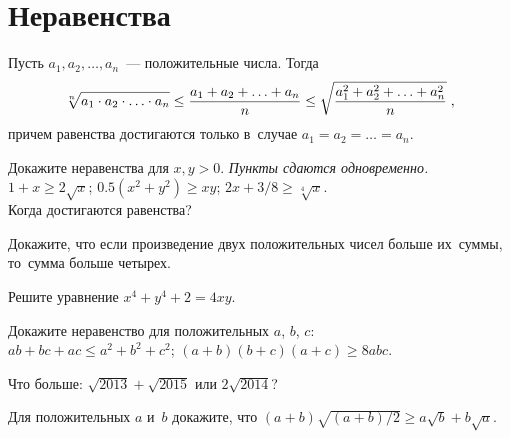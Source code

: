 
\section*{Неравенства}




Пусть $a_1, a_2, \ldots, a_n$~--- положительные числа.
Тогда
\[
    \sqrt[n]{\mathstrut
        a_1 \cdot a_2 \cdot \ldots \cdot a_n
    }
\leq
    \frac{
        a_1 + a_2 + \ldots + a_n
    }{n}
\leq
    \sqrt{\frac{
        a_1^2 + a_2^2 + \ldots + a_n^2
    }{n}}
\;,\]
причем равенства достигаются только в~случае $a_1 = a_2 = \ldots = a_n$.

\begin{problems}

\item
Докажите неравенства для $x, y > 0$.
\emph{Пункты сдаются одновременно.}
\\[0.25ex]
\sp $1 + x \geq 2 \sqrt{x}$;
\quad
\sp $0.5 (x^2 + y^2) \geq x y$;
\quad
\sp $2 x + 3 / 8 \geq \sqrt[4]{x}$.
\\[0.25ex]
Когда достигаются равенства?

\item
Докажите, что если произведение двух положительных чисел больше их~суммы,
то~сумма больше четырех.

\item
Решите уравнение\enspace
$x^4 + y^4 + 2 = 4 x y$.

\item
Докажите неравенство для положительных $a$, $b$, $c$:
\\[0.3ex]
\sp $a b + b c + a c \leq a^2 + b^2 + c^2$;
\qquad
\sp $(a + b) (b + c) (a + c) \geq 8 a b c$.

\item
Что больше:\enspace
$\sqrt{2013} + \sqrt{2015}$\enspace
или\enspace
$2 \sqrt{2014}$?

\item
Для положительных $a$ и~$b$ докажите, что\enspace
\(
    (a + b) \sqrt{(a + b) / 2}
\geq
    a \sqrt{b} + b \sqrt{a}
.\)

\end{problems}

